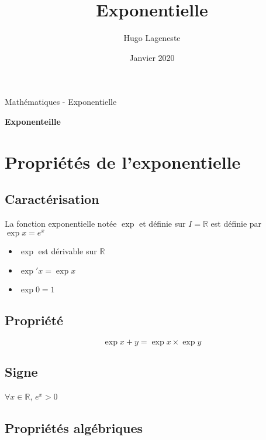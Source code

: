 \documentclass[a4paper]{article}
\title{Exponentielle}
\author{Hugo Lageneste}
\date{Janvier 2020}
\begin{document}
{Mathématiques - Exponentielle}

\begin{center}
 \newcommand{\HRule}{\rule{\linewidth}{0.5mm}}
 {\huge \bfseries Exponenteille}\\[0.1cm]
\end{center}

\section{Propriétés de l'exponentielle}
\subsection{Caractérisation}

{La fonction exponentielle notée $\exp{}$ et définie sur $I=\mathbb{R}$ est définie par $\exp{x}=e^x$}

\begin{multicols}{3}
	\begin{itemize}
  		\item{$\exp{}$ est dérivable sur $\mathbb{R}$}
  		\item{$\exp{}\prime x=\exp{x}$}
  		\item{$\exp{0}=1$}
	\end{itemize}
\end{multicols}

\subsection{Propriété}

\[\exp{x+y}=\exp{x} \times \exp{y}\]

\subsection{Signe}

{$\forall x \in \mathbb{R}$, $e^x > 0$}

\begin{center}
\end{center}

\subsection{Propriétés algébriques}
\end{document}
